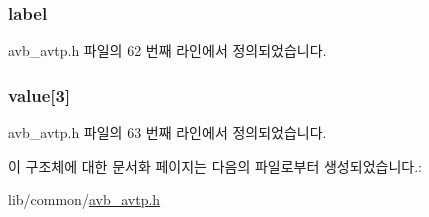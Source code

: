 \subsubsection[{\texorpdfstring{label}{label}}]{ label}\hypertarget{structsix1883__sample_a6abd170e74558ffbdb4fdfb852dbfe0c}{}\label{structsix1883__sample_a6abd170e74558ffbdb4fdfb852dbfe0c}


avb\+\_\+avtp.\+h 파일의 62 번째 라인에서 정의되었습니다.

\subsubsection[{\texorpdfstring{value}{value}}]{ value\mbox{[}3\mbox{]}}\hypertarget{structsix1883__sample_a0fee1dc0f9c734d9591dc4eed119c68a}{}\label{structsix1883__sample_a0fee1dc0f9c734d9591dc4eed119c68a}


avb\+\_\+avtp.\+h 파일의 63 번째 라인에서 정의되었습니다.



이 구조체에 대한 문서화 페이지는 다음의 파일로부터 생성되었습니다.\+:\begin{DoxyCompactItemize}
\item 
lib/common/\hyperlink{avb__avtp_8h}{avb\+\_\+avtp.\+h}\end{DoxyCompactItemize}
